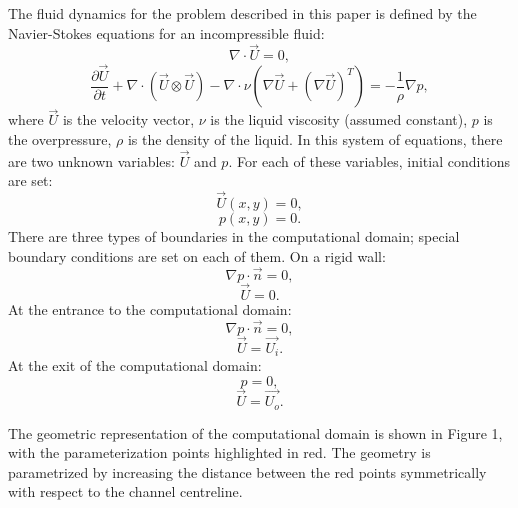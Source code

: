 \documentclass{aip-cp}
\begin{document}
The fluid dynamics for the problem described in this paper is defined by the Navier-Stokes equations for an incompressible fluid:
\[
\nabla \cdot \vec{U} = 0,
\]
\[
\frac{\partial \vec{U}}{\partial t} + \nabla \cdot \left( \vec{U} \otimes \vec{U}\right) - \nabla \cdot \nu \left( \nabla \vec{U} + (\nabla \vec{U})^T\right) = - \frac{1}{\rho} \nabla p,
\]
where $\vec{U}$ is the velocity vector, $\nu$  is the liquid viscosity (assumed constant), $p$  is the overpressure, $\rho$ is the density of the liquid. In this system of equations, there are two unknown variables: $\vec{U}$  and $p$. For each of these variables, initial conditions are set: 
\[
\vec{U}(x,y) = 0,
\]
\[
p(x,y) = 0.
\]
There are three types of boundaries in the computational domain; special boundary conditions are set on each of them. 
On a rigid wall:
\[
\nabla p \cdot \vec{n} = 0,
\]
\[
\vec{U} = 0.
\]
At the entrance to the computational domain:
\[
\nabla p \cdot \vec{n} = 0,
\]
\[
\vec{U} = \vec{U_i}.
\]
At the exit of the computational domain:
\[
 p = 0,
\]
\[
\vec{U} = \vec{U_o}.
\]

The geometric representation of the computational domain is shown in Figure 1, with the parameterization points highlighted in red. The geometry is parametrized by increasing the distance between the red points symmetrically with respect to the channel centreline. 
\end{document}
